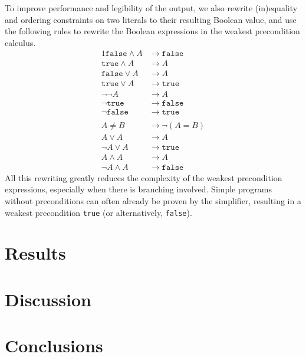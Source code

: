 \documentclass[a4paper]{article}
\begin{document}
To improve performance and legibility of the output, we also rewrite (in)equality and ordering constraints on two literals to their resulting Boolean value, and use the following rules to rewrite the Boolean expressions in the weakest precondition calculus.
\begin{alignat*}{1}
\mathtt{false} \wedge A &\longrightarrow \mathtt{false}\\
\mathtt{true} \wedge A &\longrightarrow A\\
\mathtt{false} \vee A &\longrightarrow A\\
\mathtt{true} \vee A &\longrightarrow \mathtt{true}\\
\neg\neg A &\longrightarrow A\\
\neg\mathtt{true} &\longrightarrow \mathtt{false}\\
\neg\mathtt{false} &\longrightarrow \mathtt{true}\\\\
A \neq B &\longrightarrow \neg(A = B)\\
A \vee A &\longrightarrow A\\
\neg A \vee A &\longrightarrow \mathtt{true}\\
A \wedge A &\longrightarrow A\\
\neg A \wedge A &\longrightarrow \mathtt{false}
\end{alignat*}
All this rewriting greatly reduces the complexity of the weakest precondition expressions, especially when there is branching involved. Simple programs without preconditions can often already be proven by the simplifier, resulting in a weakest precondition \texttt{true} (or alternatively, \texttt{false}).

\begin{comment}

\end{comment}


\section{Results}

\section{Discussion}

\section{Conclusions}
\end{document}

